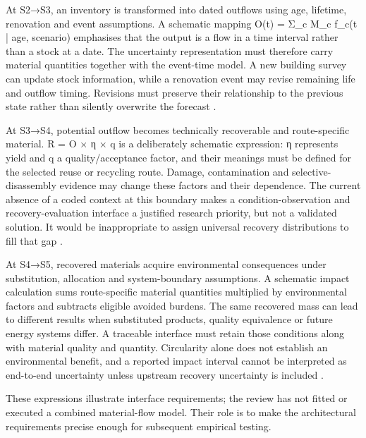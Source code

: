 At S2→S3, an inventory is transformed into dated outflows using age, lifetime, renovation and event assumptions. A schematic mapping O(t) = Σ\_c M\_c f\_c(t | age, scenario) emphasises that the output is a flow in a time interval rather than a stock at a date. The uncertainty representation must therefore carry material quantities together with the event-time model. A new building survey can update stock information, while a renovation event may revise remaining life and outflow timing. Revisions must preserve their relationship to the previous state rather than silently overwrite the forecast \citep{U11,U12,U13,U18}.

At S3→S4, potential outflow becomes technically recoverable and route-specific material. R = O × η × q is a deliberately schematic expression: η represents yield and q a quality/acceptance factor, and their meanings must be defined for the selected reuse or recycling route. Damage, contamination and selective-disassembly evidence may change these factors and their dependence. The current absence of a coded context at this boundary makes a condition-observation and recovery-evaluation interface a justified research priority, but not a validated solution. It would be inappropriate to assign universal recovery distributions to fill that gap \citep{I20,I21}.

At S4→S5, recovered materials acquire environmental consequences under substitution, allocation and system-boundary assumptions. A schematic impact calculation sums route-specific material quantities multiplied by environmental factors and subtracts eligible avoided burdens. The same recovered mass can lead to different results when substituted products, quality equivalence or future energy systems differ. A traceable interface must retain those conditions along with material quality and quantity. Circularity alone does not establish an environmental benefit, and a reported impact interval cannot be interpreted as end-to-end uncertainty unless upstream recovery uncertainty is included \citep{U19,I22,I38}.

These expressions illustrate interface requirements; the review has not fitted or executed a combined material-flow model. Their role is to make the architectural requirements precise enough for subsequent empirical testing.

